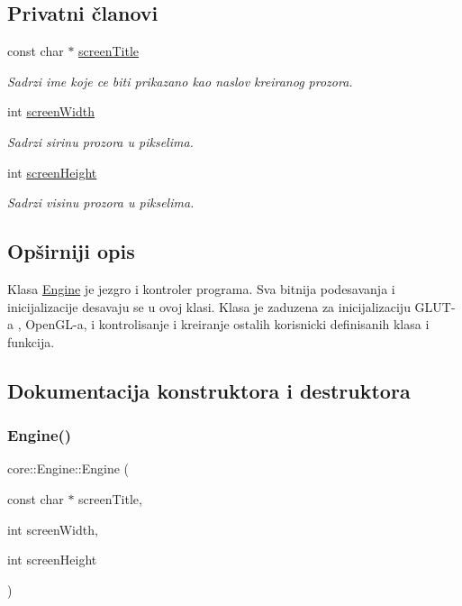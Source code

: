 \subsection*{Privatni članovi}
\begin{DoxyCompactItemize}
\item 
const char $\ast$ \hyperlink{classcore_1_1Engine_ad695d2314128b2500074282b10139804}{screen\+Title}
\begin{DoxyCompactList}\small\item\em Sadrzi ime koje ce biti prikazano kao naslov kreiranog prozora. \end{DoxyCompactList}\item 
int \hyperlink{classcore_1_1Engine_a69e16377fb9f9420b7147e0465abd1f7}{screen\+Width}
\begin{DoxyCompactList}\small\item\em Sadrzi sirinu prozora u pikselima. \end{DoxyCompactList}\item 
int \hyperlink{classcore_1_1Engine_a40fe67e2a2dbbc34c1955fa2b28d87bc}{screen\+Height}
\begin{DoxyCompactList}\small\item\em Sadrzi visinu prozora u pikselima. \end{DoxyCompactList}\end{DoxyCompactItemize}


\subsection{Opširniji opis}
Klasa \hyperlink{classcore_1_1Engine}{Engine} je jezgro i kontroler programa. Sva bitnija podesavanja i inicijalizacije desavaju se u ovoj klasi. Klasa je zaduzena za inicijalizaciju G\+L\+U\+T-\/a , Open\+G\+L-\/a, i kontrolisanje i kreiranje ostalih korisnicki definisanih klasa i funkcija. 

\subsection{Dokumentacija konstruktora i destruktora}
\mbox{\label{classcore_1_1Engine_a9ca4bcdbd363e861fea0e15fbdbf7016}} 
\subsubsection{\texorpdfstring{Engine()}{Engine()}}
{\footnotesize\ttfamily core\+::\+Engine\+::\+Engine (\begin{DoxyParamCaption}\item[{const char $\ast$}]{screen\+Title,  }\item[{int}]{screen\+Width,  }\item[{int}]{screen\+Height }\end{DoxyParamCaption})}




